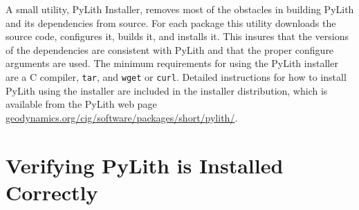 A small utility, PyLith Installer, removes most of the obstacles in
building PyLith and its dependencies from source. For each package
this utility downloads the source code, configures it, builds it,
and installs it. This insures that the versions of the dependencies
are consistent with PyLith and that the proper configure arguments
are used. The minimum requirements for using the PyLith installer
are a C compiler, \texttt{tar}, and \texttt{wget} or \texttt{curl}.
Detailed instructions for how to install PyLith using the installer
are included in the installer distribution, which is available from
the PyLith web page \url{geodynamics.org/cig/software/packages/short/pylith/}.


\section{Verifying PyLith is Installed Correctly}

